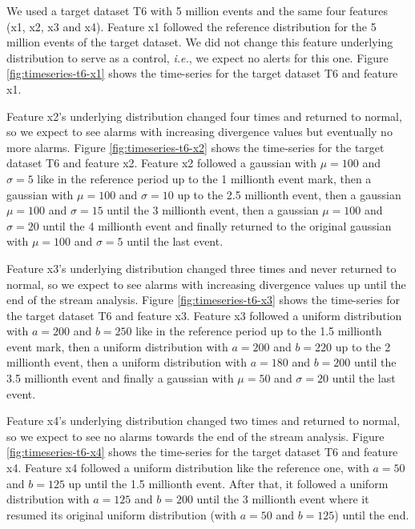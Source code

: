We used a target dataset T6 with 5 million events and the same four features (x1, x2, x3 and x4). Feature x1 followed the reference distribution for the 5 million events of the target dataset. We did not change this feature underlying distribution to serve as a control, \textit{i.e.}, we expect no alerts for this one. Figure \ref{fig:timeseries-t6-x1} shows the time-series for the target dataset T6 and feature x1. 

Feature x2's underlying distribution changed four times and returned to normal, so we expect to see alarms with increasing divergence values but eventually no more alarms. Figure \ref{fig:timeseries-t6-x2} shows the time-series for the target dataset T6 and feature x2. Feature x2 followed a gaussian with $\mu=100$ and $\sigma=5$ like in the reference period up to the 1 millionth event mark, then a gaussian with $\mu=100$ and $\sigma=10$ up to the 2.5 millionth event, then a gaussian $\mu=100$ and $\sigma=15$ until the 3 millionth event, then a gaussian $\mu=100$ and $\sigma=20$ until the 4 millionth event and finally returned to the original gaussian with $\mu=100$ and $\sigma=5$ until the last event.

Feature x3's underlying distribution changed three times and never returned to normal, so we expect to see alarms with increasing divergence values up until the end of the stream analysis. Figure \ref{fig:timeseries-t6-x3} shows the time-series for the target dataset T6 and feature x3. Feature x3 followed a uniform distribution with $a=200$ and $b=250$ like in the reference period up to the 1.5 millionth event mark, then a uniform distribution with $a=200$ and $b=220$ up to the 2 millionth event, then a uniform distribution with $a=180$ and $b=200$ until the 3.5 millionth event and finally a gaussian with $\mu=50$ and $\sigma=20$ until the last event.

Feature x4's underlying distribution changed two times and returned to normal, so we expect to see no alarms towards the end of the stream analysis. Figure \ref{fig:timeseries-t6-x4} shows the time-series for the target dataset T6 and feature x4. Feature x4 followed a uniform distribution like the reference one, with $a=50$ and $b=125$ up until the 1.5 millionth event. After that, it followed a uniform distribution with $a=125$ and $b=200$ until the 3 millionth event where it resumed its original uniform distribution (with $a=50$ and $b=125$) until the end.

